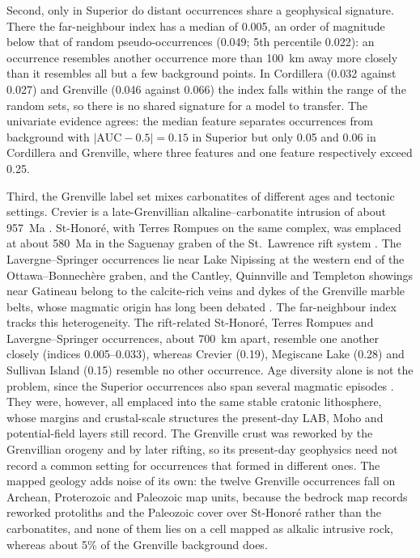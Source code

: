 \documentclass[pdflatex,sn-apa]{sn-jnl}
\begin{document}
Second, only in Superior do distant occurrences share a geophysical signature. There the far-neighbour index has a median of 0.005, an order of magnitude below that of random pseudo-occurrences (0.049; 5th percentile 0.022): an occurrence resembles another occurrence more than 100~km away more closely than it resembles all but a few background points. In Cordillera (0.032 against 0.027) and Grenville (0.046 against 0.066) the index falls within the range of the random sets, so there is no shared signature for a model to transfer. The univariate evidence agrees: the median feature separates occurrences from background with $|\mathrm{AUC}-0.5| = 0.15$ in Superior but only 0.05 and 0.06 in Cordillera and Grenville, where three features and one feature respectively exceed 0.25.

Third, the Grenville label set mixes carbonatites of different ages and tectonic settings. Crevier is a late-Grenvillian alkaline--carbonatite intrusion of about 957~Ma \citep{Groulier2020}. St-Honoré, with Terres Rompues on the same complex, was emplaced at about 580~Ma in the Saguenay graben of the St.~Lawrence rift system \citep{Neron2018}. The Lavergne--Springer occurrences lie near Lake Nipissing at the western end of the Ottawa--Bonnech\`ere graben, and the Cantley, Quinnville and Templeton showings near Gatineau belong to the calcite-rich veins and dykes of the Grenville marble belts, whose magmatic origin has long been debated \citep{Moecher1997}. The far-neighbour index tracks this heterogeneity. The rift-related St-Honoré, Terres Rompues and Lavergne--Springer occurrences, about 700~km apart, resemble one another closely (indices 0.005--0.033), whereas Crevier (0.19), Megiscane Lake (0.28) and Sullivan Island (0.15) resemble no other occurrence. Age diversity alone is not the problem, since the Superior occurrences also span several magmatic episodes \citep{Rukhlov2010}. They were, however, all emplaced into the same stable cratonic lithosphere, whose margins and crustal-scale structures the present-day LAB, Moho and potential-field layers still record. The Grenville crust was reworked by the Grenvillian orogeny and by later rifting, so its present-day geophysics need not record a common setting for occurrences that formed in different ones. The mapped geology adds noise of its own: the twelve Grenville occurrences fall on Archean, Proterozoic and Paleozoic map units, because the bedrock map records reworked protoliths and the Paleozoic cover over St-Honoré rather than the carbonatites, and none of them lies on a cell mapped as alkalic intrusive rock, whereas about 5\% of the Grenville background does.
\end{document}

